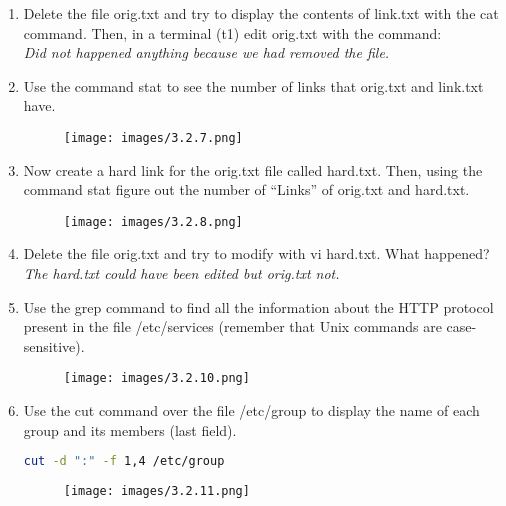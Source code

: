 \documentclass[12pt, titlepage,]{article}
\begin{document}
\begin{enumerate}
\clearpage


    \item Delete the file orig.txt and try to display the contents of link.txt with the cat command. Then, in a terminal (t1) edit orig.txt with the command:
    \\
    \textit{\color{blue} Did not happened anything because we had removed the file.}    

    \item Use the command stat to see the number of links that orig.txt and link.txt have. 
    \begin{figure}[h] %
    \centering
    \texttt{[image: images/3.2.7.png]}
\end{figure}

    \item Now create a hard link for the orig.txt file called hard.txt. Then, using the command stat figure out the number of “Links” of orig.txt and hard.txt. 
    \begin{figure}[h] %
    \centering
    \texttt{[image: images/3.2.8.png]}
\end{figure}

    \item Delete the file orig.txt and try to modify with vi hard.txt. What happened? 
    \\
        \textit{\color{blue} The hard.txt could have been edited but orig.txt not.}  


    \item Use the grep command to find all the information about the HTTP protocol present in the file /etc/services (remember that Unix commands are case-sensitive).
     \begin{figure}[h] %
    \centering
    \texttt{[image: images/3.2.10.png]}
\end{figure}
\vspace{50mm}

    \item Use the cut command over the file /etc/group to display the name of each group and its members (last field). 
\begin{lstlisting}[language=Bash]
 cut -d ":" -f 1,4 /etc/group  
\end{lstlisting}
\begin{figure}[h] %
    \centering
    \texttt{[image: images/3.2.11.png]}
\end{figure}


\end{enumerate}
\end{document}
